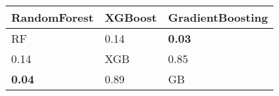 \begin{tabular}{lll}
\toprule
RandomForest & XGBoost & GradientBoosting \\
\midrule
RF & 0.14 & \textbf{0.03} \\
0.14 & XGB & 0.85 \\
\textbf{0.04} & 0.89 & GB \\
\bottomrule
\end{tabular}
